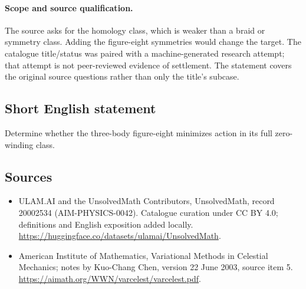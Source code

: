 \documentclass[11pt]{article}
\begin{document}
\paragraph{Scope and source qualification.}The source asks for the homology class, which is weaker than a braid or symmetry class. Adding the figure-eight symmetries would change the target. The catalogue title/status was paired with a machine-generated research attempt; that attempt is not peer-reviewed evidence of settlement. The statement covers the original source questions rather than only the title’s subcase.
\subsection{Short English statement}
Determine whether the three-body figure-eight minimizes action in its full zero-winding class.
\subsection{Sources}
\begin{itemize}
\item[\hypertarget{source:20002534:1}{S1}] ULAM.AI and the UnsolvedMath Contributors, UnsolvedMath, record 20002534 (AIM-PHYSICS-0042). Catalogue curation under CC BY 4.0; definitions and English exposition added locally.
\url{https://huggingface.co/datasets/ulamai/UnsolvedMath}.
\item[\hypertarget{source:20002534:2}{S2}] American Institute of Mathematics, Variational Methods in Celestial Mechanics; notes by Kuo-Chang Chen, version 22 June 2003, source item 5.
\url{https://aimath.org/WWN/varcelest/varcelest.pdf}.
\end{itemize}
\label{end:20002534}
\end{document}
